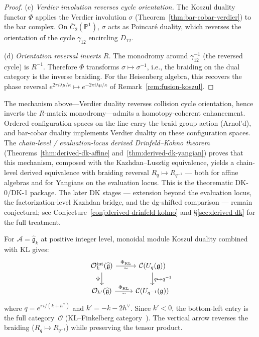 \begin{proof}
\noindent (c) \emph{Verdier involution reverses cycle orientation.}
The Koszul duality functor $\Phi$ applies the Verdier involution
$\sigma$ (Theorem~\ref{thm:bar-cobar-verdier}) to the bar complex.
On $\overline{C}_2(\mathbb{P}^1)$, $\sigma$ acts as Poincar\'{e}
duality, which reverses the orientation of the cycle
$\gamma_{12}$ encircling $D_{12}$.

\noindent (d) \emph{Orientation reversal inverts $R$.}
The monodromy around $\gamma_{12}^{-1}$ (the reversed cycle) is
$R^{-1}$.  Therefore $\Phi$ transforms
$\sigma \mapsto \sigma^{-1}$, i.e., the braiding on the dual
category is the inverse braiding.
For the Heisenberg algebra, this recovers the phase
reversal $e^{2\pi i\lambda\mu/\kappa} \mapsto
e^{-2\pi i\lambda\mu/\kappa}$ of
Remark~\ref{rem:fusion-koszul}.
\end{proof}

\begin{remark}\label{rem:towards-derived-dk}
The mechanism above---Verdier duality reverses collision cycle
orientation, hence inverts the $R$-matrix monodromy---admits a
homotopy-coherent enhancement.  Ordered configuration spaces on
the line carry the braid group action (Arnol'd), and bar-cobar
duality implements Verdier duality on these configuration spaces.
The \emph{chain-level / evaluation-locus derived Drinfeld--Kohno theorem}
(Theorems~\ref{thm:derived-dk-affine}
and~\ref{thm:derived-dk-yangian}) proves that this mechanism,
composed with the Kazhdan--Lusztig equivalence, yields a
chain-level derived equivalence with braiding reversal
$R_q \mapsto R_{q^{-1}}$ --- both for affine algebras and for
Yangians on the evaluation locus.  This is the theorematic DK-0/DK-1
package.  The later DK stages --- extension beyond the evaluation
locus, the factorization-level Kazhdan bridge, and the dg-shifted
comparison --- remain conjectural; see
Conjecture~\textup{\ref{conj:derived-drinfeld-kohno}} and
\S\ref{sec:derived-dk} for the full treatment.
\end{remark}

\begin{remark}
\label{rem:quantum-group-braiding}
For $\mathcal{A} = \widehat{\mathfrak{g}}_k$ at positive integer level,
monoidal module Koszul duality combined with KL gives:
\[
\begin{tikzcd}
\mathcal{O}_k^{\mathrm{int}}(\widehat{\mathfrak{g}})
  \ar[r, "\Phi_{\mathrm{KL}}", "\sim"']
  \ar[d, "\Phi"']
& \mathcal{C}(U_q(\mathfrak{g}))
  \ar[d, "q \mapsto q^{-1}"]
\\
\mathcal{O}_{k'}(\widehat{\mathfrak{g}})
  \ar[r, "\Phi_{\mathrm{KL}}", "\sim"']
& \mathcal{C}(U_{q^{-1}}(\mathfrak{g}))
\end{tikzcd}
\]
where $q = e^{\pi i/(k + h^\vee)}$ and $k' = -k - 2h^\vee$.
Since $k' < 0$, the bottom-left entry is the full category~$\mathcal{O}$ (KL--Finkelberg category~\cite{KL93}).  The vertical arrow reverses the braiding ($R_q \mapsto R_{q^{-1}}$) while preserving the tensor product.
\end{remark}

